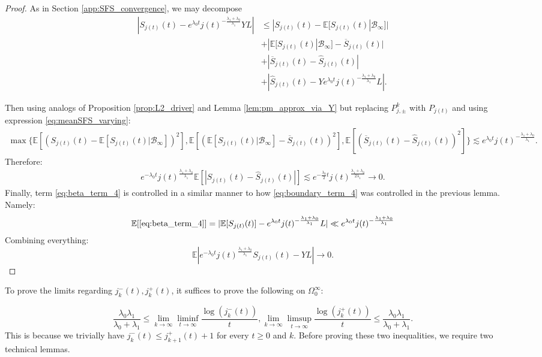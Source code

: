 \documentclass{article}
\numberwithin{equation}{section}
\begin{document}
\begin{proof}
  As in Section \ref{app:SFS_convergence}, we may decompose
  \begin{align}
    |S_{j(t)}(t)-e^{\lambda_0 t}j(t)^{-\frac{\lambda_1+\lambda_0}{\lambda_1}}YL|&\leq |S_{j(t)}(t)-\mathbb{E}[S_{j(t)}(t)|\mathcal{B}_\infty]|\label{eq:beta_term_1}\\
    &+|\mathbb{E}[S_{j(t)}(t)|\mathcal{B}_\infty]-\overline{S}_{j(t)}(t)|\label{eq:beta_term_2}\\
    &+|\overline{S}_{j(t)}(t)-\widehat{S}_{j(t)}(t)|\label{eq:beta_term_3}\\
    &+|\widehat{S}_{j(t)}(t)-Ye^{\lambda_0 t}j(t)^{-\frac{\lambda_1+\lambda_0}{\lambda_1}}L|.\label{eq:beta_term_4}
  \end{align}

  Then using analogs of Proposition \ref{prop:L2_driver} and Lemma \ref{lem:pm_approx_via_Y} but replacing $P_{j,\pm}^k$ with $P_{j(t)}$ and using expression \ref{eq:meanSFS_varying}:
  \begin{align*}
    \max\{\mathbb{E}[(S_{j(t)}(t)-\mathbb{E}[S_{j(t)}(t)|\mathcal{B}_\infty])^2],\mathbb{E}[(\mathbb{E}[S_{j(t)}(t)|\mathcal{B}_\infty]-\overline{S}_{j(t)}(t))^2],\mathbb{E}[(\overline{S}_{j(t)}(t)-\widehat{S}_{j(t)}(t))^2]\}\lesssim e^{\lambda_0 t}j(t)^{-\frac{\lambda_1+\lambda_0}{\lambda_1}}.
  \end{align*}
Therefore:
  \begin{align*}
    e^{-\lambda_0 t}j(t)^{\frac{\lambda_1+\lambda_0}{\lambda_1}}\mathbb{E}[|S_{j(t)}(t)-\widehat{S}_{j(t)}(t)|]\lesssim e^{-\frac{\lambda_0}{2}t}j(t)^{\frac{\lambda_1+\lambda_0}{2\lambda_1}}\to 0.
  \end{align*}
Finally, term \ref{eq:beta_term_4} is controlled in a similar manner to how \ref{eq:boundary_term_4} was controlled in the previous lemma. Namely:
\begin{align*}
    \mathbb{E}[\ref{eq:beta_term_4}]=|\mathbb{E}[S_{j(t)}(t)]-e^{\lambda_0 t}j(t)^{-\frac{\lambda_1+\lambda_0}{\lambda_1}}L|\ll e^{\lambda_0 t}j(t)^{-\frac{\lambda_1+\lambda_0}{\lambda_1}}
\end{align*}
Combining everything:
\[\mathbb{E}\left|e^{-\lambda_0 t}j(t)^{\frac{\lambda_1+\lambda_0}{\lambda_1}}S_{j(t)}(t)-YL\right|\to 0.\]
\end{proof}

To prove the limits regarding $j_k^-(t),j_k^+(t)$, it suffices to prove the following on $\Omega_0^\infty$:

\[\frac{\lambda_0\lambda_1}{\lambda_0+\lambda_1}\leq \lim_{k\to\infty}\liminf_{t\to\infty}\frac{\log(j_k^-(t))}{t},\lim_{k\to\infty}\limsup_{t\to\infty}\frac{\log(j_k^+(t))}{t}\leq \frac{\lambda_0\lambda_1}{\lambda_0+\lambda_1}.\]
This is because we trivially have $j_k^-(t)\leq j_{k+1}^+(t)+1$ for every $t\geq 0$ and $k$. Before proving these two inequalities, we require two technical lemmas.
\end{document}
